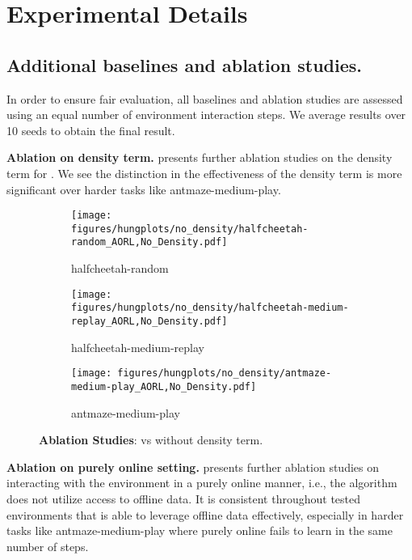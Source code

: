 \section{Experimental Details}\label{app:experiment}
\subsection{Additional baselines and ablation studies.}
In order to ensure fair evaluation, all baselines and ablation studies are assessed using an equal number of environment interaction steps. We average results over 10 seeds to obtain the final result.



     

\textbf{Ablation on density term.} 
presents further ablation studies on the density term for \algname. We see the distinction in the effectiveness of the density term is more significant over harder tasks like antmaze-medium-play.

\begin{figure*}[h]
    \centering
    \begin{subfigure}{.33\textwidth}
        \centering
        \texttt{[image: figures/hungplots/no\_density/halfcheetah-random\_AORL,No\_Density.pdf]}
        \caption{halfcheetah-random}\label{fig:supp:without_onlineness:1}
    \end{subfigure}\hfil
    \begin{subfigure}{.33\textwidth}
        \centering
        \texttt{[image: figures/hungplots/no\_density/halfcheetah-medium-replay\_AORL,No\_Density.pdf]}
        \caption{halfcheetah-medium-replay}\label{fig:supp:without_onlineness:2}
    \end{subfigure}\hfil
    \begin{subfigure}{.33\textwidth}
        \centering
        \texttt{[image: figures/hungplots/no\_density/antmaze-medium-play\_AORL,No\_Density.pdf]}
        \caption{antmaze-medium-play}\label{fig:supp:without_onlineness:3}
    \end{subfigure}\hfil
    \caption{\textbf{Ablation Studies}: \algname vs \algname without density term.}
  \label{fig:supp:without_onlineness}
\end{figure*}

\textbf{Ablation on purely online setting.} 
presents further ablation studies on \algname interacting with the environment in a purely online manner, i.e., the algorithm does not utilize access to offline data. It is consistent throughout tested environments that \algname is able to leverage offline data effectively, especially in harder tasks like antmaze-medium-play where purely online \algname fails to learn in the same number of steps.

